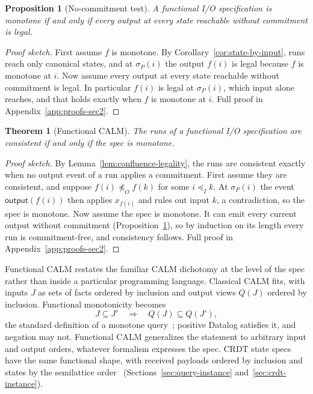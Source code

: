 \documentclass[sigconf]{cidr-2027}
\newtheorem{theorem}{Theorem}
\newtheorem{proposition}{Proposition}
\theoremstyle{remark}
\newcommand{\InputOrd}{\preceq_I}
\newcommand{\OutputOrd}{\preceq_O}
\newcommand{\commitment}{commitment\xspace}
\newcommand{\spectype}[1][]{I/O specification#1\xspace}
\begin{document}
\begin{proposition}[No-\commitment test]
\label{prop:functional-exposure-boundary}
\textcolor{reviewed}{A functional \spectype is monotone if and only if every output at
every state reachable without \commitment is legal.}
\end{proposition}

\begin{proof}[Proof sketch]
First assume $f$ is monotone. By Corollary~\ref{cor:state-by-input}, runs
reach only canonical states, and at $\sigma_P(i)$ the output $f(i)$ is legal
because $f$ is monotone at $i$. Now assume every output at every state
reachable without \commitment is legal. In particular $f(i)$ is legal at
$\sigma_P(i)$, which input alone reaches, and that holds exactly when $f$ is
monotone at $i$. Full proof in Appendix~\ref{app:proofs-sec2}.
\end{proof}

\begin{theorem}[Functional CALM]
\label{thm:functional-calm}
\textcolor{reviewed}{The runs of a functional \spectype are consistent if and only if the spec is
monotone.}
\end{theorem}

\begin{proof}[Proof sketch]
\textcolor{reviewed}{By Lemma~\ref{lem:confluence-legality}, the runs are consistent exactly when
no output event of a run applies a \commitment.} \textcolor{reviewed}{First assume they are
consistent, and suppose $f(i)\not\OutputOrd f(k)$ for some $i\InputOrd k$.} At
$\sigma_P(i)$ the event $\mathsf{output}(f(i))$ then applies $x_{f(i)}$ and
rules out input $k$, a contradiction, so the spec is monotone. \textcolor{reviewed}{Now assume the
spec is monotone.} It can emit every current output without \commitment
(Proposition~\ref{prop:functional-exposure-boundary}), so by induction on its
length every run is \commitment-free, and consistency follows. Full proof in
Appendix~\ref{app:proofs-sec2}.
\end{proof}

\textcolor{reviewed}{Functional CALM restates the familiar CALM dichotomy at the level of the spec
rather than inside a particular programming language.} \textcolor{reviewed}{Classical CALM fits, with inputs $J$ as sets of facts ordered by
inclusion and output views $Q(J)$ ordered by inclusion.} \textcolor{reviewed}{Functional
monotonicity becomes}
        \begin{equation}
  J\subseteq J'
  \quad\Longrightarrow\quad
  Q(J)\subseteq Q(J'),
  \label{eq:query-monotonicity}
        \end{equation}
\textcolor{reviewed}{the standard definition of a monotone query~\cite{abiteboul1995foundations};
positive Datalog satisfies it, and negation may not.} \textcolor{reviewed}{Functional CALM
generalizes the statement to arbitrary input and
output orders, whatever formalism expresses the spec.} \textcolor{reviewed}{CRDT state specs have the same functional shape, with received payloads ordered by inclusion and states by the semilattice order~\cite{shapiro2011crdt} (Sections~\ref{sec:query-instance}
and~\ref{sec:crdt-instance}).}
\end{document}
